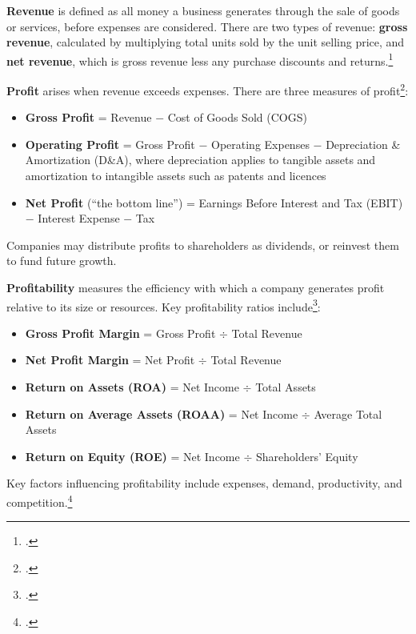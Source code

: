 \textbf{Revenue} is defined as all money a business generates through the sale of goods or 
services, before expenses are considered. There are two types of revenue: \textbf{gross 
revenue}, calculated by multiplying total units sold by the unit selling price, and 
\textbf{net revenue}, which is gross revenue less any purchase discounts and 
returns.\footcite{revenue}

\textbf{Profit} arises when revenue exceeds expenses. There are three measures of 
profit\footcite{kenton_2024_understanding}:

\begin{itemize}
    \item \textbf{Gross Profit} = Revenue $-$ Cost of Goods Sold (COGS)
    \item \textbf{Operating Profit} = Gross Profit $-$ Operating Expenses $-$ 
    Depreciation \& Amortization (D\&A), where depreciation applies to tangible assets 
    and amortization to intangible assets such as patents and licences
    \item \textbf{Net Profit} (``the bottom line'') = Earnings Before Interest and Tax 
    (EBIT) $-$ Interest Expense $-$ Tax
\end{itemize}

Companies may distribute profits to shareholders as dividends, or reinvest them to fund future growth.

\textbf{Profitability} measures the efficiency with which a company generates profit relative to its size or resources. Key profitability ratios include\footcite{horton_2026_understanding}:

\begin{itemize}
    \item \textbf{Gross Profit Margin} = Gross Profit $\div$ Total Revenue
    \item \textbf{Net Profit Margin} = Net Profit $\div$ Total Revenue
    \item \textbf{Return on Assets (ROA)} = Net Income $\div$ Total Assets
    \item \textbf{Return on Average Assets (ROAA)} = Net Income $\div$ Average Total Assets
    \item \textbf{Return on Equity (ROE)} = Net Income $\div$ Shareholders' Equity
\end{itemize}

 Key factors influencing profitability include expenses, demand, productivity, and competition.\footcite{horton_2026_understanding}
